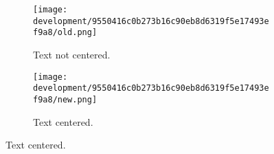 \documentclass[../development.tex]{subfiles}
\begin{document}
\begin{figure}[H]
	\hspace{0.05\linewidth}
	\centering
	\begin{minipage}{0.35\linewidth}
		\centering
		\begin{figure}[H]
			\centering
			\texttt{[image: development/9550416c0b273b16c90eb8d6319f5e17493ef9a8/old.png]}
			\caption{Text not centered.}
			\label{fig:development:9550416c0b273b16c90eb8d6319f5e17493ef9a8:old.png}
		\end{figure}
	\end{minipage}%
	\hspace{0.2\linewidth}
	\begin{minipage}{0.35\linewidth}
		\centering
		\begin{figure}[H]
			\centering
			\texttt{[image: development/9550416c0b273b16c90eb8d6319f5e17493ef9a8/new.png]}
			\caption{Text centered.}
			\label{fig:development:9550416c0b273b16c90eb8d6319f5e17493ef9a8:new.png}
		\end{figure}
	\end{minipage}
	\hspace{0.05\linewidth}
	\vspace{-1em}
\end{figure}
\end{document}
